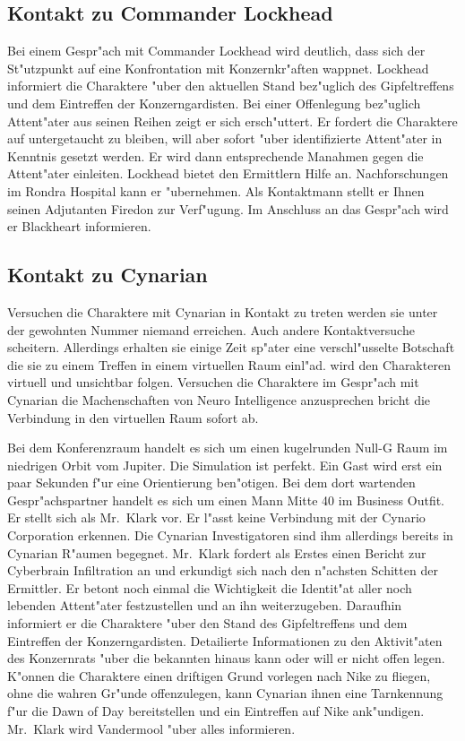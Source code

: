 \subsection{Kontakt zu Commander Lockhead} 
Bei einem Gespr"ach mit Commander Lockhead wird deutlich, dass sich der St"utzpunkt auf eine Konfrontation mit Konzernkr"aften wappnet. Lockhead informiert die Charaktere "uber den aktuellen Stand bez"uglich des Gipfeltreffens und dem Eintreffen der Konzerngardisten. Bei einer Offenlegung bez"uglich Attent"ater aus seinen Reihen zeigt er sich ersch"uttert. Er fordert die Charaktere auf untergetaucht zu bleiben, will aber sofort "uber identifizierte Attent"ater in Kenntnis gesetzt werden. Er wird dann entsprechende Ma\3nahmen gegen die Attent"ater einleiten. Lockhead bietet den Ermittlern Hilfe an. Nachforschungen im Rondra Hospital kann er "ubernehmen. Als Kontaktmann stellt er Ihnen seinen Adjutanten Firedon zur Verf"ugung. Im Anschluss an das Gespr"ach wird er Blackheart informieren.

\subsection{Kontakt zu Cynarian} 
Versuchen die Charaktere mit Cynarian in Kontakt zu treten werden sie unter der gewohnten Nummer niemand erreichen. Auch andere Kontaktversuche scheitern. Allerdings erhalten sie einige Zeit sp"ater eine verschl"usselte Botschaft die sie zu einem Treffen in einem virtuellen Raum einl"ad. \xl{} wird den Charakteren virtuell und unsichtbar folgen. Versuchen die Charaktere im Gespr"ach mit Cynarian die Machenschaften von Neuro Intelligence anzusprechen bricht die Verbindung in den virtuellen Raum sofort ab. 

Bei dem Konferenzraum handelt es sich um einen kugelrunden Null-G Raum im niedrigen Orbit vom Jupiter. Die Simulation ist perfekt. Ein Gast wird erst ein paar Sekunden f"ur eine Orientierung ben"otigen. Bei dem dort wartenden Gespr"achspartner handelt es sich um einen Mann Mitte 40 im Business Outfit. Er stellt sich als Mr.~Klark vor. Er l"asst keine Verbindung mit der Cynario Corporation erkennen. Die Cynarian Investigatoren sind ihm allerdings bereits in Cynarian R"aumen begegnet. Mr.~Klark fordert als Erstes einen Bericht zur Cyberbrain Infiltration an und erkundigt sich nach den n"achsten Schitten der Ermittler. Er betont noch einmal die Wichtigkeit die Identit"at aller noch lebenden Attent"ater festzustellen und an ihn weiterzugeben. Daraufhin informiert er die Charaktere "uber den Stand des Gipfeltreffens und dem Eintreffen der Konzerngardisten. Detailierte Informationen zu den Aktivit"aten des Konzernrats "uber die bekannten hinaus kann oder will er nicht offen legen. K"onnen die Charaktere einen driftigen Grund vorlegen nach Nike zu fliegen, ohne die wahren Gr"unde offenzulegen, kann Cynarian ihnen eine Tarnkennung f"ur die Dawn of Day bereitstellen und ein Eintreffen auf Nike ank"undigen. Mr.~Klark wird Vandermool "uber alles informieren.

